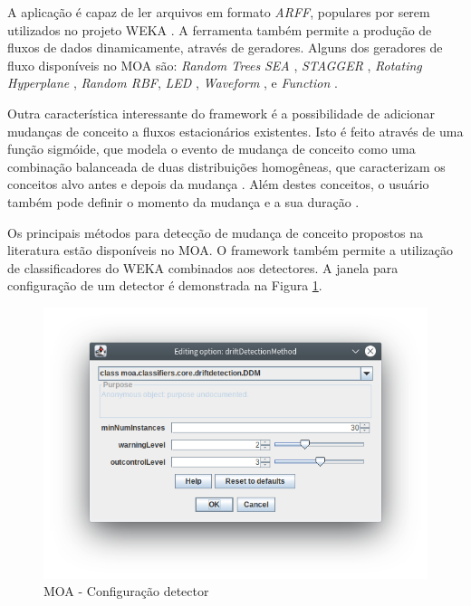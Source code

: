 \documentclass[qual, classic, a4paper]{ufbathesis}
\begin{document}
A aplicação é capaz de ler arquivos em formato \textit{ARFF}, populares por serem utilizados no projeto WEKA \cite{Hall:2009:WDM:1656274.1656278}.
A ferramenta também permite a produção de fluxos de dados dinamicamente, através de geradores.
Alguns dos geradores de fluxo disponíveis no MOA são:
\textit{Random Trees} \cite{Domingos:2000:MHD:347090.347107}
\textit{SEA} \cite{Street:2001:SEA:502512.502568}, 
\textit{STAGGER} \cite{Schlimmer1986}, 
\textit{Rotating Hyperplane} \cite{Wang:2003:MCD:956750.956778},
\textit{Random RBF}, 
\textit{LED} \cite{Gama:2003:ADT:956750.956813}, 
\textit{Waveform} \cite{Gama:2003:ADT:956750.956813}, 
 e \textit{Function} \cite{Jin:2003:EDT:956750.956821}.

Outra característica interessante do framework é a possibilidade de adicionar mudanças de conceito a fluxos estacionários existentes.
Isto é feito através de uma função sigmóide, que modela o evento de mudança de conceito como uma combinação balanceada de duas distribuições homogêneas, 
que caracterizam os conceitos alvo antes e depois da mudança \cite{bifet2009data}.
Além destes conceitos, o usuário também pode definir o momento da mudança e a sua duração \cite{Bifet:2010:MMO:1756006.1859903}.

Os principais métodos para detecção de mudança de conceito propostos na literatura estão disponíveis no MOA.
O framework também permite a utilização de classificadores do WEKA \cite{Hall:2009:WDM:1656274.1656278} combinados aos detectores.
A janela para configuração de um detector é demonstrada na Figura \ref{fig:moa_detector}.

\begin{figure}[!ht]
\begin{center}
    \includegraphics[scale=1]{imagens/detector.png}
    \caption{MOA - Configuração detector}
    \label{fig:moa_detector}
\end{center}
\end{figure}
\end{document}
